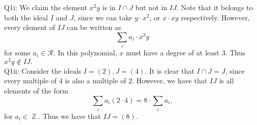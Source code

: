 \documentclass[letterpaper]{article}
\DeclareMathOperator{\Z}{\mathbb{Z}}
\begin{document}
 
\noindent Q1i: We claim the element $x^2y$ is in $I\cap J$ but not in $IJ$. Note that it belongs to both the ideal $I$ and $J$, since we can take $y\cdot x^2$, or $x\cdot xy$ respectively. However, every element of $IJ$ can be written as $$\sum_{i}a_i \cdot x^3y$$ for some $a_i\in \mathcal{R}.$ In this polynomial, $x$ must have a degree of at least $3.$ Thus $x^2y \not \in IJ.$
\newline \\ Q1ii: Consider the ideals $I = (2), J=(4).$ It is clear that $I\cap J =J$, since every multiple of $4$ is also a multiple of $2$. However, we have that $IJ$ is all elements of the form $$\sum_{i}a_i (2\cdot 4) = 8\cdot \sum_{i}a_i,$$ for $a_i\in \Z$. Thus we have that $IJ = (8).$  
\end{document}
